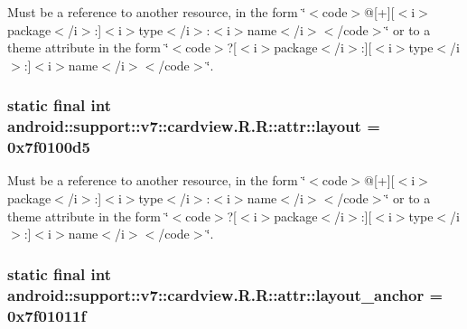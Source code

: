 Must be a reference to another resource, in the form \char`\"{}$<$code$>$@\mbox{[}+\mbox{]}\mbox{[}$<$i$>$package$<$/i$>$:\mbox{]}$<$i$>$type$<$/i$>$:$<$i$>$name$<$/i$>$$<$/code$>$\char`\"{} or to a theme attribute in the form \char`\"{}$<$code$>$?\mbox{[}$<$i$>$package$<$/i$>$:\mbox{]}\mbox{[}$<$i$>$type$<$/i$>$:\mbox{]}$<$i$>$name$<$/i$>$$<$/code$>$\char`\"{}. \hypertarget{classandroid_1_1support_1_1v7_1_1cardview_1_1_r_1_1attr_b4bde139a358634c17f871fc784d4e5e}{
\subsubsection[{layout}]{\setlength{\rightskip}{0pt plus 5cm}static final int android::support::v7::cardview.R.R::attr::layout = 0x7f0100d5}}
\label{classandroid_1_1support_1_1v7_1_1cardview_1_1_r_1_1attr_b4bde139a358634c17f871fc784d4e5e}


Must be a reference to another resource, in the form \char`\"{}$<$code$>$@\mbox{[}+\mbox{]}\mbox{[}$<$i$>$package$<$/i$>$:\mbox{]}$<$i$>$type$<$/i$>$:$<$i$>$name$<$/i$>$$<$/code$>$\char`\"{} or to a theme attribute in the form \char`\"{}$<$code$>$?\mbox{[}$<$i$>$package$<$/i$>$:\mbox{]}\mbox{[}$<$i$>$type$<$/i$>$:\mbox{]}$<$i$>$name$<$/i$>$$<$/code$>$\char`\"{}. \hypertarget{classandroid_1_1support_1_1v7_1_1cardview_1_1_r_1_1attr_10e71d2b9ba9fda4306beeef2573ab2f}{
\subsubsection[{layout\_\-anchor}]{\setlength{\rightskip}{0pt plus 5cm}static final int android::support::v7::cardview.R.R::attr::layout\_\-anchor = 0x7f01011f}}
\label{classandroid_1_1support_1_1v7_1_1cardview_1_1_r_1_1attr_10e71d2b9ba9fda4306beeef2573ab2f}



